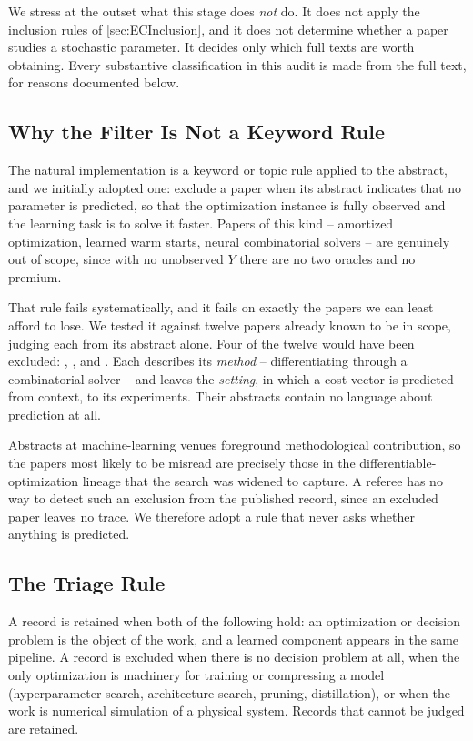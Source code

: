 We stress at the outset what this stage does \emph{not} do. It does not apply the inclusion rules of
\cref{sec:ECInclusion}, and it does not determine whether a paper studies a stochastic parameter. It
decides only which full texts are worth obtaining. Every substantive classification in this audit is
made from the full text, for reasons documented below.

\subsection{Why the Filter Is Not a Keyword Rule}

The natural implementation is a keyword or topic rule applied to the abstract, and we initially
adopted one: exclude a paper when its abstract indicates that no parameter is predicted, so that the
optimization instance is fully observed and the learning task is to solve it faster. Papers of this
kind -- amortized optimization, learned warm starts, neural combinatorial solvers -- are genuinely
out of scope, since with no unobserved \(Y\) there are no two oracles and no premium.

That rule fails systematically, and it fails on exactly the papers we can least afford to lose. We
tested it against twelve papers already known to be in scope, judging each from its abstract alone.
Four of the twelve would have been excluded: \citet{berthet2020learning},
\citet{poganvcic2020differentiation}, \citet{sahoo2023backpropagation} and
\citet{niepert2021implicit}. Each describes its
\emph{method} -- differentiating through a combinatorial solver -- and leaves the \emph{setting}, in
which a cost vector is predicted from context, to its experiments. Their abstracts contain no
language about prediction at all.

Abstracts at machine-learning venues foreground methodological contribution, so the papers most
likely to be misread are precisely those in the differentiable-optimization lineage that the search
was widened to capture. A referee has no way to
detect such an exclusion from the published record, since an excluded paper leaves no trace. We
therefore adopt a rule that never asks whether anything is predicted.

\subsection{The Triage Rule}

A record is retained when both of the following hold: an optimization or decision problem is the
object of the work, and a learned component appears in the same pipeline. A record is excluded when
there is no decision problem at all, when the only optimization is machinery for training or
compressing a model (hyperparameter search, architecture search, pruning, distillation), or when the
work is numerical simulation of a physical system. Records that cannot be judged are retained.

